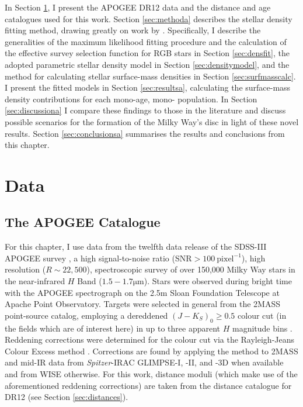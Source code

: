 In Section \ref{sec:dataa}, I present the APOGEE DR12 data and the distance and age catalogues used for this work. Section \ref{sec:methoda} describes the stellar density fitting method, drawing greatly on work by \citet{2016ApJ...818..130B,2016ApJ...823...30B}. Specifically, I describe the generalities of the maximum likelihood fitting procedure and the calculation of the effective survey selection function for RGB stars in Section \ref{sec:densfit}, the adopted parametric stellar density model in Section \ref{sec:densitymodel}, and the method for calculating stellar surface-mass densities in Section \ref{sec:surfmasscalc}. I present the fitted models in Section \ref{sec:resultsa}, calculating the surface-mass density contributions for each mono-age, mono-\feh{} population. In Section \ref{sec:discussiona} I compare these findings to those in the literature and discuss possible scenarios for the formation of the Milky Way's disc in light of these novel results. Section \ref{sec:conclusionsa} summarises the results and conclusions from this chapter. 


 \section{Data}

\label{sec:dataa}
 \subsection{The APOGEE Catalogue}
 \label{sec:APOGEE}
For this chapter, I use data from the twelfth data release \citep[DR12,][]{2015ApJS..219...12A} of the SDSS-III APOGEE survey \citep[][]{2015arXiv150905420M}, a high signal-to-noise ratio (SNR$>100\ \mathrm{pixel}^{-1}$), high resolution ($R \sim 22,500$), spectroscopic survey of over 150,000 Milky Way stars in the near-infrared $H$ Band ($1.5 - 1.7 \mathrm{\mu m}$). Stars were observed during bright time with the APOGEE spectrograph \citep{2010SPIE.7735E..1CW} on the 2.5m Sloan Foundation Telescope \citep{2006AJ....131.2332G} at Apache Point Observatory. Targets were selected in general from the 2MASS point-source catalog, employing a dereddened $(J-K_S)_0 \geq 0.5$ colour cut (in the fields which are of interest here) in up to three apparent $H$ magnitude bins \citep[for a full description of the APOGEE target selection, see][]{2013AJ....146...81Z}. Reddening corrections were determined for the colour cut via the Rayleigh-Jeans Colour Excess method \citep[RJCE,][]{2011ApJ...739...25M}. Corrections are found by applying the method to 2MASS \citep{2006AJ....131.1163S} and mid-IR data from \emph{Spitzer}-IRAC GLIMPSE-I, -II, and -3D \citep{2009PASP..121..213C} when available and from WISE \citep{2010AJ....140.1868W} otherwise. For this work, distance moduli (which make use of the aforementioned reddening corrections) are taken from the \citet{2015ApJ...808..132H} distance catalogue for DR12 (see Section \ref{sec:distances}). 

